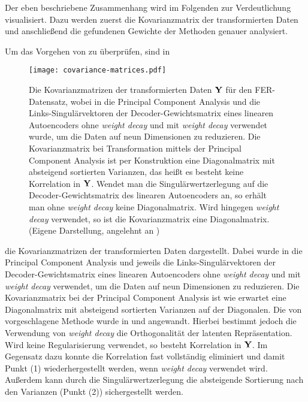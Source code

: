 Der eben beschriebene Zusammenhang wird im Folgenden zur Verdeutlichung visualisiert. Dazu werden
zuerst die Kovarianzmatrix der transformierten Daten und anschließend die gefundenen Gewichte der
Methoden genauer analysiert.

Um das Vorgehen von \textcite{Plaut.2018} zu überprüfen, sind in 
\begin{figure}[ht]
	\centering
	\texttt{[image: covariance-matrices.pdf]}
	\caption[Kovarianzmatrizen der transformierten Daten $\mat{Y}$ für den FER-Datensatz von drei Methoden]{Die Kovarianzmatrizen der transformierten Daten $\mat{Y}$ für den FER-Datensatz, wobei in \captiona die Principal Component Analysis und die Links-Singulärvektoren der Decoder-Gewichtsmatrix eines linearen Autoencoders \captionb ohne \textit{weight decay} und \captionc mit \textit{weight decay} verwendet wurde, um die Daten auf neun Dimensionen zu reduzieren. Die Kovarianzmatrix bei Transformation mittels der Principal Component Analysis ist per Konstruktion eine Diagonalmatrix mit absteigend sortierten Varianzen, das heißt es besteht keine Korrelation in $\mat{Y}$. Wendet man die Singulärwertzerlegung auf die Decoder-Gewichtsmatrix des linearen Autoencoders an, so erhält man ohne \textit{weight decay} keine Diagonalmatrix. Wird hingegen \textit{weight decay} verwendet, so ist die Kovarianzmatrix eine Diagonalmatrix. (Eigene Darstellung, angelehnt an \textcite[5]{Plaut.2018})}
	\label{fig:Kovarianzmatrizen}
\end{figure}
die Kovarianzmatrizen der transformierten Daten dargestellt. Dabei wurde in \captiona die Principal Component Analysis und jeweils die Links-Singulärvektoren der Decoder-Gewichtsmatrix eines linearen Autoencoders \captionb ohne \textit{weight decay} und \captionc mit \textit{weight decay} verwendet, um die Daten auf neun Dimensionen zu reduzieren. Die Kovarianzmatrix bei der Principal Component Analysis ist wie erwartet eine Diagonalmatrix mit absteigend sortierten Varianzen auf der Diagonalen. Die von \textcite{Plaut.2018} vorgeschlagene Methode wurde in \captionb und \captionc angewandt. Hierbei bestimmt jedoch die Verwendung von \textit{weight decay} die Orthogonalität der latenten Repräsentation. Wird keine Regularisierung verwendet, so besteht Korrelation in $\mat{Y}$. Im Gegensatz dazu konnte die Korrelation fast vollständig eliminiert und damit Punkt (1) wiederhergestellt werden, wenn \textit{weight decay} verwendet wird. Außerdem kann durch die Singulärwertzerlegung die absteigende Sortierung nach den Varianzen (Punkt (2)) sichergestellt werden.

